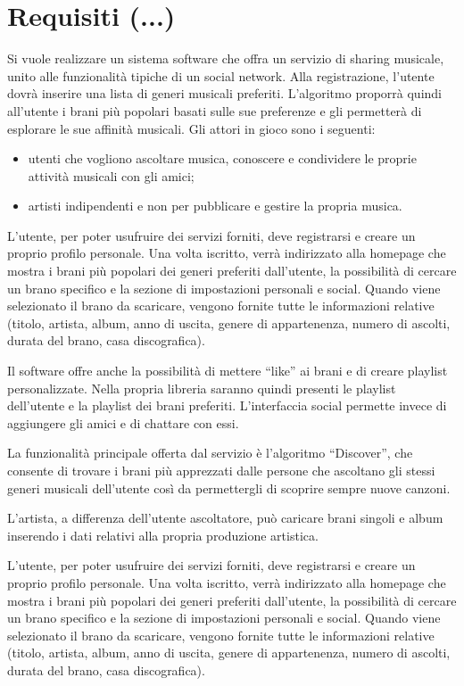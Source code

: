 \section{Requisiti (...)}
Si vuole realizzare un sistema software che offra un servizio di sharing musicale, unito
alle funzionalità tipiche di un social network. Alla registrazione, l'utente dovrà
inserire una lista di generi musicali preferiti. L'algoritmo proporrà quindi all'utente i
brani più popolari basati sulle sue preferenze e gli permetterà di esplorare le sue
affinità musicali. Gli attori in gioco sono i seguenti:
\begin{itemize}
    \item utenti che vogliono ascoltare musica, conoscere e condividere le proprie
          attività musicali con gli amici;
    \item artisti indipendenti e non per pubblicare e gestire la propria musica.
\end{itemize}

L'utente, per poter usufruire dei servizi forniti, deve registrarsi e creare un proprio
profilo personale. Una volta iscritto, verrà indirizzato alla homepage che mostra i brani
più popolari dei generi preferiti dall'utente, la possibilità di cercare un brano
specifico e la sezione di impostazioni personali e social. Quando viene selezionato il
brano da scaricare, vengono fornite tutte le informazioni relative (titolo, artista,
album, anno di uscita, genere di appartenenza, numero di ascolti, durata del brano, casa
discografica).

Il software offre anche la possibilità di mettere ``like'' ai brani e di creare playlist
personalizzate. Nella propria libreria saranno quindi presenti le playlist dell'utente e
la playlist dei brani preferiti. L'interfaccia social permette invece di aggiungere gli
amici e di chattare con essi.

La funzionalità principale offerta dal servizio è l'algoritmo ``Discover'', che consente
di trovare i brani più apprezzati dalle persone che ascoltano gli stessi generi musicali
dell'utente così da permettergli di scoprire sempre nuove canzoni.

L'artista, a differenza dell'utente ascoltatore, può caricare brani singoli e album
inserendo i dati relativi alla propria produzione artistica.

L'utente, per poter usufruire dei servizi forniti, deve registrarsi e creare un proprio
profilo personale. Una volta iscritto, verrà indirizzato alla homepage che mostra i brani
più popolari dei generi preferiti dall'utente, la possibilità di cercare un brano
specifico e la sezione di impostazioni personali e social. Quando viene selezionato il
brano da scaricare, vengono fornite tutte le informazioni relative (titolo, artista,
album, anno di uscita, genere di appartenenza, numero di ascolti, durata del brano, casa
discografica).

